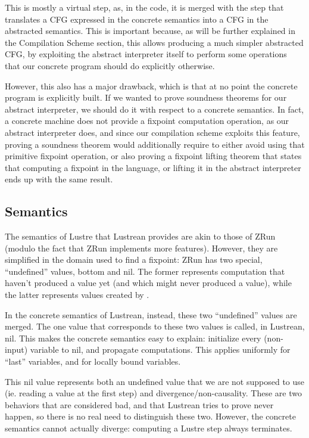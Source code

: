 \documentclass{scrartcl}
\begin{document}
This is mostly a virtual step, as, in the code, it is merged with the step that translates a CFG
expressed in the concrete semantics into a CFG in the abstracted semantics.  This is important
because, as will be further explained in the Compilation Scheme section, this allows producing a
much simpler abstracted CFG, by exploiting the abstract interpreter itself to perform some
operations that our concrete program should do explicitly otherwise.

However, this also has a major drawback, which is that at no point the concrete program is
explicitly built.  If we wanted to prove soundness theorems for our abstract interpreter, we
should do it with respect to a concrete semantics.  In fact, a concrete machine does not provide
a fixpoint computation operation, as our abstract interpreter does, and since our compilation
scheme exploits this feature, proving a soundness theorem would additionally require to either
avoid using that primitive fixpoint operation, or also proving a fixpoint lifting theorem that
states that computing a fixpoint in the language, or lifting it in the abstract interpreter ends
up with the same result.

\subsection{Semantics}
The semantics of Lustre that Lustrean provides are akin to those of ZRun (modulo the fact that
ZRun implements more features).  However, they are simplified in the domain used to find a
fixpoint: ZRun has two special, ``undefined'' values, bottom and nil.  The former represents
computation that haven't produced a value yet (and which might never produced a value), while the
latter represents values created by .

In the concrete semantics of Lustrean, instead, these two ``undefined'' values are merged.  The
one value that corresponds to these two values is called, in Lustrean, nil.  This makes the
concrete semantics easy to explain: initialize every (non-input) variable to nil, and propagate
computations.  This applies uniformly for ``last'' variables, and for locally bound variables.

This nil value represents both an undefined value that we are not supposed to use (ie. reading a
 value at the first step) and divergence/non-causality.  These are two behaviors
that are considered bad, and that Lustrean tries to prove never happen, so there is no real need
to distinguish these two.  However, the concrete semantics cannot actually diverge: computing a
Lustre step always terminates.
\end{document}
